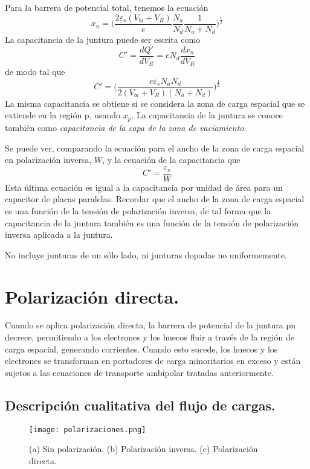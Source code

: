 \documentclass[12pt,a4paper]{article}
\begin{document}
Para la barrera de potencial total, tenemos la ecuación
\[ x_{n}= \bigg( \frac{2 \varepsilon _{s} (V_{bi}+V_{R})}{e} \frac{N_{a}}{N_{d}} \frac{1}{N_{a}+N_{d}} \bigg)^{\frac{1}{2}} \]
La capacitancia de la juntura puede ser escrita como
\[ C'=\frac{dQ'}{dV_{R}}=eN_{d} \frac{dx_{n}}{dV_{R}} \]
de modo tal que
\[ C'=\bigg( \frac{e \varepsilon _{s} N_{a}N_{d}}{2(V_{bi}+V_{R})(N_{a}+N_{d})} \bigg)^{\frac{1}{2}} \]
La misma capacitancia se obtiene si se considera la zona de carga espacial que se extiende en la región p, usando $x_{p}$. La capacitancia de la juntura se conoce también como \emph{capacitancia de la capa de la zona de vaciamiento}.

Se puede ver, comparando la ecuación para el ancho de la zona de carga espacial en polarización inversa, $W$, y la ecuación de la capacitancia que
\[ C'=\frac{\varepsilon _{s}}{W} \]
Esta última ecuación es igual a la capacitancia por unidad de área para un capacitor de placas paralelas. Recordar que el ancho de la zona de carga espacial es una función de la tensión de polarización inversa, de tal forma que la capacitancia de la juntura también es una función de la tensión de polarización inversa aplicada a la juntura.

\scriptsize No incluye junturas de un sólo lado, ni junturas dopadas no uniformemente.
\normalsize

\section{Polarización directa.}

Cuando se aplica polarización directa, la barrera de potencial de la juntura pn decrece, permitiendo a los electrones y los huecos fluir a través de la región de carga espacial, generando corrientes. Cuando esto sucede, los huecos y los electrones se transforman en portadores de carga minoritarios en exceso y están sujetos a las ecuaciones de transporte ambipolar tratadas anteriormente.

\subsection{Descripción cualitativa del flujo de cargas.}

\begin{figure}[ht!]
\begin{center}
\texttt{[image: polarizaciones.png]}
\caption{(a) Sin polarización. (b) Polarización inversa. (c) Polarización directa.}
\end{center}
\end{figure}
\end{document}
